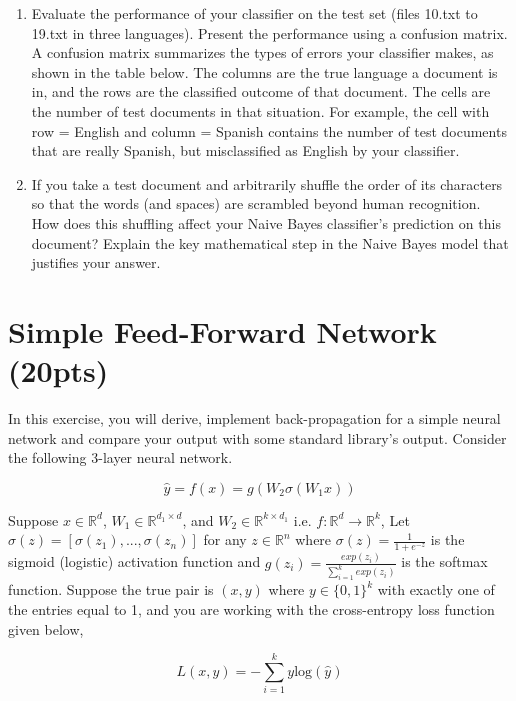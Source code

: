 \documentclass[a4paper]{article}
\theoremstyle{definition}
\begin{document}
\begin{enumerate}
	\item
	      Evaluate the performance of your classifier on the test set (files 10.txt to 19.txt in three languages).
	      Present the performance using a confusion matrix. A confusion matrix summarizes the types of errors your classifier makes, as shown in the table below.   The columns are the true language a document is in, and the rows are the classified outcome of that document.  The cells are the number of test documents in that situation.  For example, the cell with row = English and column = Spanish contains the number of test documents that are really Spanish, but misclassified as English by your classifier.

	\item If you take a test document and arbitrarily shuffle the order of its characters so that the words (and spaces) are scrambled beyond human recognition.  How does this shuffling affect your Naive Bayes classifier's prediction on this document?  Explain the key mathematical step in the Naive Bayes model that justifies your answer.

\end{enumerate}

\section{Simple Feed-Forward Network (20pts)}
In this exercise, you will derive, implement back-propagation for a simple neural network and compare your output with some standard library’s output. Consider the following 3-layer neural network.

\[
	\hat{y} = f(x) = g(W_2\sigma(W_1x))
\]

Suppose $x \in \mathbb{R}^d$, $W_1 \in \mathbb{R}^{d_1 \times d}$, and $W_2 \in \mathbb{R}^{k \times d_1}$ i.e. $f: \mathbb{R}^d \rightarrow \mathbb{R}^k$, Let $\sigma(z) = [\sigma(z_1), ..., \sigma(z_n)]$ for any $z \in \mathbb{R}^n$ where $\sigma(z) = \frac{1}{1 + e^{-z}}$ is the sigmoid (logistic) activation function and $g(z_i) = \frac{exp(z_i)}{\sum_{i=1}^k exp(z_i)}$ is the softmax function. Suppose the true pair is $(x, y)$ where $y \in \{0, 1\}^k$ with exactly one of the entries equal to 1, and you are working with the cross-entropy loss function given below,

\[
	L(x, y) = -\sum_{i=1}^k y \text{log}(\hat{y})
\]
\end{document}
